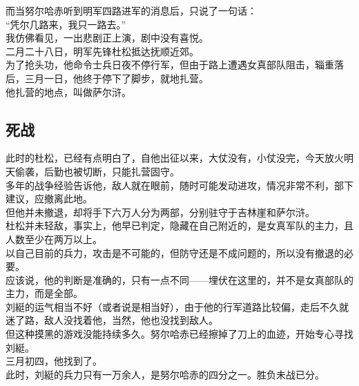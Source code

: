 \begin{multicols}{\theparacolNo}
而当努尔哈赤听到明军四路进军的消息后，只说了一句话：\\

“凭尔几路来，我只一路去。”\\

我仿佛看见，一出悲剧正上演，剧中没有喜悦。\\

二月二十八日，明军先锋杜松抵达抚顺近郊。\\

为了抢头功，他命令士兵日夜不停行军，但由于路上遭遇女真部队阻击，辎重落后，三月一日，他终于停下了脚步，就地扎营。\\

他扎营的地点，叫做萨尔浒。\\

\subsection{死战}
此时的杜松，已经有点明白了，自他出征以来，大仗没有，小仗没完，今天放火明天偷袭，后勤也被切断，只能扎营固守。\\

多年的战争经验告诉他，敌人就在眼前，随时可能发动进攻，情况非常不利，部下建议，应撤离此地。\\

但他并未撤退，却将手下六万人分为两部，分别驻守于吉林崖和萨尔浒。\\

杜松并未轻敌，事实上，他早已判定，隐藏在自己附近的，是女真军队的主力，且人数至少在两万以上。\\

以自己目前的兵力，攻击是不可能的，但防守还是不成问题的，所以没有撤退的必要。\\

应该说，他的判断是准确的，只有一点不同——埋伏在这里的，并不是女真部队的主力，而是全部。\\

刘綎的运气相当不好（或者说是相当好），由于他的行军道路比较偏，走后不久就迷了路，敌人没找着他，当然，他也没找到敌人。\\

但这种摸黑的游戏没能持续多久。努尔哈赤已经擦掉了刀上的血迹，开始专心寻找刘綎。\\

三月初四，他找到了。\\

此时，刘綎的兵力只有一万余人，是努尔哈赤的四分之一。胜负未战已分。\\


\end{multicols}
